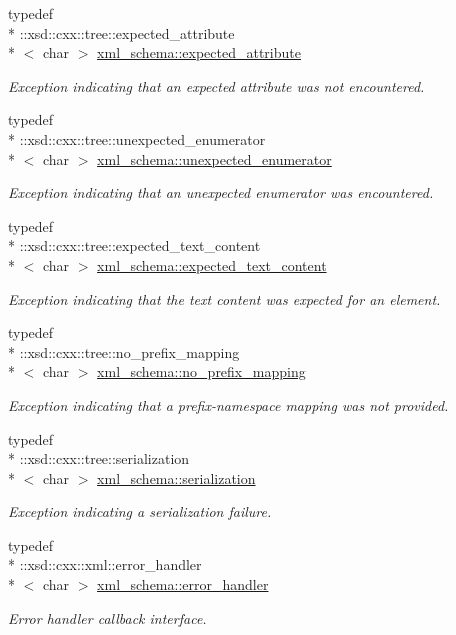 \begin{DoxyCompactItemize}
typedef \\*
\-::xsd\-::cxx\-::tree\-::expected\-\_\-attribute\\*
$<$ char $>$ \hyperlink{namespacexml__schema_af16d098ecb2b5ba96a0734aa34bd8a5b}{xml\-\_\-schema\-::expected\-\_\-attribute}
\begin{DoxyCompactList}\small\item\em Exception indicating that an expected attribute was not encountered. \end{DoxyCompactList}\item 
typedef \\*
\-::xsd\-::cxx\-::tree\-::unexpected\-\_\-enumerator\\*
$<$ char $>$ \hyperlink{namespacexml__schema_a7601f5d15eeb816df6a0e1cb2b0f379b}{xml\-\_\-schema\-::unexpected\-\_\-enumerator}
\begin{DoxyCompactList}\small\item\em Exception indicating that an unexpected enumerator was encountered. \end{DoxyCompactList}\item 
typedef \\*
\-::xsd\-::cxx\-::tree\-::expected\-\_\-text\-\_\-content\\*
$<$ char $>$ \hyperlink{namespacexml__schema_ad0938777db5685ea04372a964518e87b}{xml\-\_\-schema\-::expected\-\_\-text\-\_\-content}
\begin{DoxyCompactList}\small\item\em Exception indicating that the text content was expected for an element. \end{DoxyCompactList}\item 
typedef \\*
\-::xsd\-::cxx\-::tree\-::no\-\_\-prefix\-\_\-mapping\\*
$<$ char $>$ \hyperlink{namespacexml__schema_a103914036487a85ba84743f0e65b1d96}{xml\-\_\-schema\-::no\-\_\-prefix\-\_\-mapping}
\begin{DoxyCompactList}\small\item\em Exception indicating that a prefix-\/namespace mapping was not provided. \end{DoxyCompactList}\item 
typedef \\*
\-::xsd\-::cxx\-::tree\-::serialization\\*
$<$ char $>$ \hyperlink{namespacexml__schema_a40e04a11c9e6204762591b4de3755899}{xml\-\_\-schema\-::serialization}
\begin{DoxyCompactList}\small\item\em Exception indicating a serialization failure. \end{DoxyCompactList}\item 
typedef \\*
\-::xsd\-::cxx\-::xml\-::error\-\_\-handler\\*
$<$ char $>$ \hyperlink{namespacexml__schema_a0a5d9528e9175cedf199984a8bb64d62}{xml\-\_\-schema\-::error\-\_\-handler}
\begin{DoxyCompactList}\small\item\em Error handler callback interface. \end{DoxyCompactList}\end{DoxyCompactItemize}
